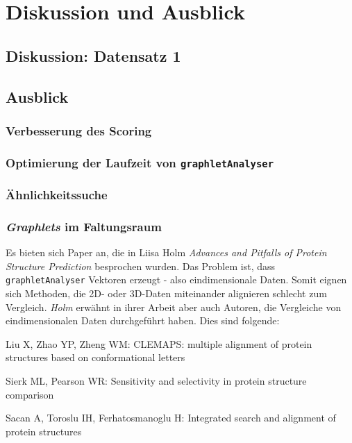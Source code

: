 \documentclass{report}
\begin{document}
\chapter{Diskussion und Ausblick}



\section{Diskussion: Datensatz 1}



\section{Ausblick}

\subsection{Verbesserung des Scoring}

\subsection{Optimierung der Laufzeit von \texttt{graphletAnalyser}}

\subsection{\"Ahnlichkeitssuche}

\subsection{\textit{Graphlets} im Faltungsraum}



Es bieten sich Paper an, die in Liisa Holm \textit{Advances and Pitfalls of Protein Structure Prediction} besprochen wurden. Das Problem ist, dass \texttt{graphletAnalyser} Vektoren erzeugt - also eindimensionale Daten. Somit eignen sich Methoden, die 2D- oder 3D-Daten miteinander alignieren schlecht zum Vergleich. \textit{Holm} erw\"ahnt in ihrer Arbeit aber auch Autoren, die Vergleiche von eindimensionalen Daten durchgef\"uhrt haben. Dies sind folgende:

Liu X, Zhao YP, Zheng WM: CLEMAPS: multiple alignment of protein structures based on conformational letters

Sierk ML, Pearson WR: Sensitivity and selectivity in protein structure comparison

Sacan A, Toroslu IH, Ferhatosmanoglu H: Integrated search and alignment of protein structures
\end{document}
